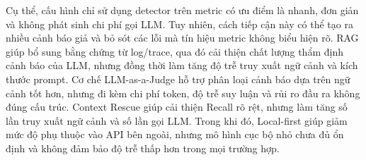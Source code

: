 Cụ thể, cấu hình chỉ sử dụng detector trên metric có ưu điểm là nhanh, đơn giản và không phát sinh chi phí gọi LLM. Tuy nhiên, cách tiếp cận này có thể tạo ra nhiều cảnh báo giả và bỏ sót các lỗi mà tín hiệu metric không biểu hiện rõ. RAG giúp bổ sung bằng chứng từ log/trace, qua đó cải thiện chất lượng thẩm định cảnh báo của LLM, nhưng đồng thời làm tăng độ trễ truy xuất ngữ cảnh và kích thước prompt. Cơ chế LLM-as-a-Judge hỗ trợ phân loại cảnh báo dựa trên ngữ cảnh tốt hơn, nhưng đi kèm chi phí token, độ trễ suy luận và rủi ro đầu ra không đúng cấu trúc. Context Rescue giúp cải thiện Recall rõ rệt, nhưng làm tăng số lần truy xuất ngữ cảnh và số lần gọi LLM. Trong khi đó, Local-first giúp giảm mức độ phụ thuộc vào API bên ngoài, nhưng mô hình cục bộ nhỏ chưa đủ ổn định và không đảm bảo độ trễ thấp hơn trong mọi trường hợp.


